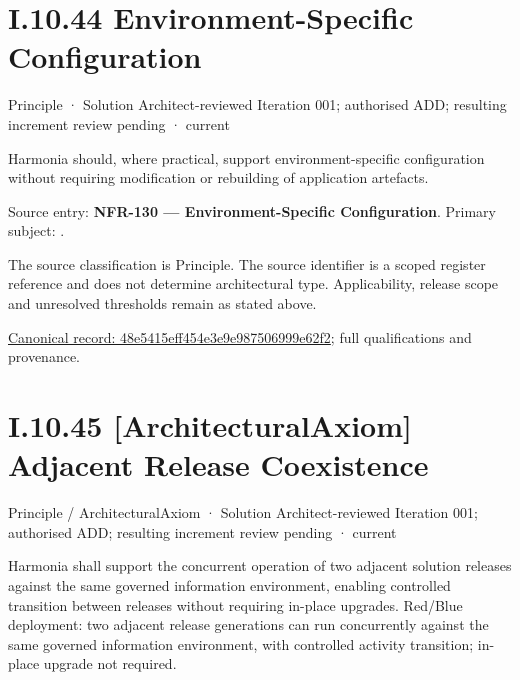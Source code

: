 \section*{I.10.44 Environment-Specific Configuration}
\label{navigation:I.10.44}

\label{element:48e5415eff454e3e9e987506999e62f2}
{\small Principle · Solution Architect-reviewed Iteration 001; authorised ADD; resulting increment review pending · current}\par

Harmonia should, where practical, support environment-specific configuration without requiring modification or rebuilding of application artefacts.



Source entry: \textbf{NFR-130 — Environment-Specific Configuration}. Primary subject: \texttt{}.



The source classification is Principle. The source identifier is a scoped register reference and does not determine architectural type. Applicability, release scope and unresolved thresholds remain as stated above.


{\footnotesize \href{../../../../../../../../continuum/motivation/principle/48e5415eff454e3e9e987506999e62f2.md}{Canonical record: 48e5415eff454e3e9e987506999e62f2}; full qualifications and provenance.}\par
\section*{I.10.45 [ArchitecturalAxiom] Adjacent Release Coexistence}
\label{navigation:I.10.45}

\label{element:3ce5568f2ded498386fd6fcfb142f89a}
{\small Principle / ArchitecturalAxiom · Solution Architect-reviewed Iteration 001; authorised ADD; resulting increment review pending · current}\par

Harmonia shall support the concurrent operation of two adjacent solution releases against the same governed information environment, enabling controlled transition between releases without requiring in-place upgrades. Red/Blue deployment: two adjacent release generations can run concurrently against the same governed information environment, with controlled activity transition; in-place upgrade not required.



